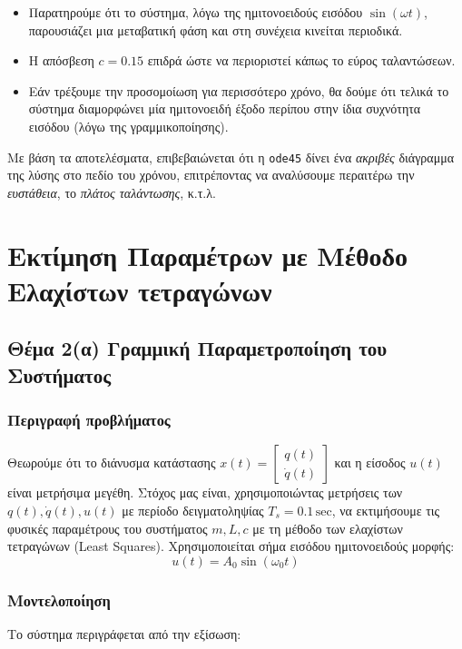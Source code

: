 \documentclass[a4paper,12pt]{report}
\newcommand{\en}{\selectlanguage{english}}
\newcommand{\gr}{\selectlanguage{greek}}
\begin{document}
\begin{itemize}
\item Παρατηρούμε ότι το σύστημα, λόγω της ημιτονοειδούς εισόδου $\sin(\omega t)$, 
παρουσιάζει μια μεταβατική φάση και στη συνέχεια κινείται περιοδικά.
\item Η απόσβεση $c=0.15$ επιδρά ώστε να περιοριστεί κάπως το εύρος ταλαντώσεων. 
\item Εάν τρέξουμε την προσομοίωση για περισσότερο χρόνο, θα δούμε ότι τελικά το 
σύστημα διαμορφώνει μία ημιτονοειδή έξοδο περίπου στην ίδια συχνότητα εισόδου 
(λόγω της γραμμικοποίησης).
\end{itemize}

\hspace{-0.6cm}Με βάση τα αποτελέσματα, επιβεβαιώνεται ότι η \en \texttt{ode45} \gr δίνει ένα \emph{ακριβές} 
διάγραμμα της λύσης στο πεδίο του χρόνου, επιτρέποντας να αναλύσουμε περαιτέρω την 
\emph{ευστάθεια}, το \emph{πλάτος ταλάντωσης}, κ.τ.λ.

\chapter{Εκτίμηση Παραμέτρων με Μέθοδο Ελαχίστων τετραγώνων}

\section{Θέμα 2(α) Γραμμική Παραμετροποίηση του Συστήματος}

\subsection*{Περιγραφή προβλήματος}
Θεωρούμε ότι το διάνυσμα κατάστασης \( x(t) = \begin{bmatrix} q(t) \\ \dot{q}(t) \end{bmatrix} \) και η είσοδος \( u(t) \) είναι μετρήσιμα μεγέθη. Στόχος μας είναι, χρησιμοποιώντας μετρήσεις των \( q(t), \dot{q}(t), u(t) \) με περίοδο δειγματοληψίας \( T_s = 0.1 \,\mathrm{sec} \), να εκτιμήσουμε τις φυσικές παραμέτρους του συστήματος \( m, L, c \) με τη μέθοδο των ελαχίστων τετραγώνων \en (Least Squares)\gr.
Χρησιμοποιείται σήμα εισόδου ημιτονοειδούς μορφής:  
\[
u(t) = A_0 \sin(\omega_0 t)
\]

\subsection*{Μοντελοποίηση}
Το σύστημα περιγράφεται από την εξίσωση:
\end{document}
